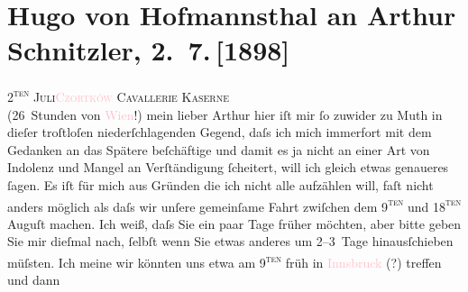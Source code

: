 

               \section[Hugo von Hofmannsthal an Arthur Schnitzler, 2. 7. {[}1898{]}]{ Hugo von Hofmannsthal an Arthur Schnitzler, 2. 7. {[}1898{]}}\nopagebreak{}\rehead{ }\normalsize\beginnumbering{} \toendnotes[C]{\smallbreak\pagebreak[2]} 
\pstart
           {\pb}\textsc{2\textsuperscript{ten} Juli}\hfill \textsc{\textcolor{pink}{Czortków}{}\ledrightnote{\textcolor{pink}{Tschortkiw}}}\pend
           \pstart
           \raggedleft{}\textsc{Cavallerie Kaserne}{\\} (26 Stunden von \textcolor{pink}{Wien}{}\ledrightnote{\textcolor{pink}{Wien}}!)\pend
           \pstart{}mein lieber Arthur\pend\pstart
           hier iſt mir ſo zuwider zu Muth in dieſer troſtloſen niederſchlagenden Gegend,
                    daſs ich mich immerfort mit dem Gedanken an das Spätere beſchäftige und damit es
                    ja nicht an einer Art von Indolenz und Mangel an Verſtändigung ſcheitert, will
                    ich gleich etwas genaueres ſagen. Es iſt {\pb}für mich aus Gründen die ich
                    nicht alle aufzählen will, faſt nicht anders möglich als daſs wir unſere
                    gemeinſame Fahrt zwiſchen dem 9\textsc{\textsuperscript{ten}} und 18\textsc{\textsuperscript{ten}} Auguſt machen. Ich weiß, daſs Sie ein paar Tage früher möchten,
                    aber bitte geben Sie mir dieſmal {\pb}nach, ſelbſt wenn Sie etwas
                    anderes um 2–3 Tage hinausſchieben müſsten. Ich meine wir könnten uns etwa am
                        9\textsc{\textsuperscript{ten}} früh in \textcolor{pink}{Innsbruck}{}\ledrightnote{\textcolor{pink}{Innsbruck}} (?) treffen und dann
